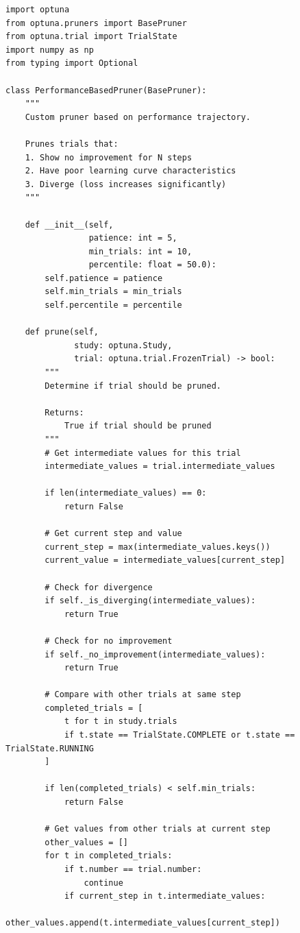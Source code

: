 \begin{lstlisting}[style=python, caption=Custom pruning strategies]
import optuna
from optuna.pruners import BasePruner
from optuna.trial import TrialState
import numpy as np
from typing import Optional

class PerformanceBasedPruner(BasePruner):
    """
    Custom pruner based on performance trajectory.

    Prunes trials that:
    1. Show no improvement for N steps
    2. Have poor learning curve characteristics
    3. Diverge (loss increases significantly)
    """

    def __init__(self,
                 patience: int = 5,
                 min_trials: int = 10,
                 percentile: float = 50.0):
        self.patience = patience
        self.min_trials = min_trials
        self.percentile = percentile

    def prune(self,
              study: optuna.Study,
              trial: optuna.trial.FrozenTrial) -> bool:
        """
        Determine if trial should be pruned.

        Returns:
            True if trial should be pruned
        """
        # Get intermediate values for this trial
        intermediate_values = trial.intermediate_values

        if len(intermediate_values) == 0:
            return False

        # Get current step and value
        current_step = max(intermediate_values.keys())
        current_value = intermediate_values[current_step]

        # Check for divergence
        if self._is_diverging(intermediate_values):
            return True

        # Check for no improvement
        if self._no_improvement(intermediate_values):
            return True

        # Compare with other trials at same step
        completed_trials = [
            t for t in study.trials
            if t.state == TrialState.COMPLETE or t.state == TrialState.RUNNING
        ]

        if len(completed_trials) < self.min_trials:
            return False

        # Get values from other trials at current step
        other_values = []
        for t in completed_trials:
            if t.number == trial.number:
                continue
            if current_step in t.intermediate_values:
                other_values.append(t.intermediate_values[current_step])


\end{lstlisting}
